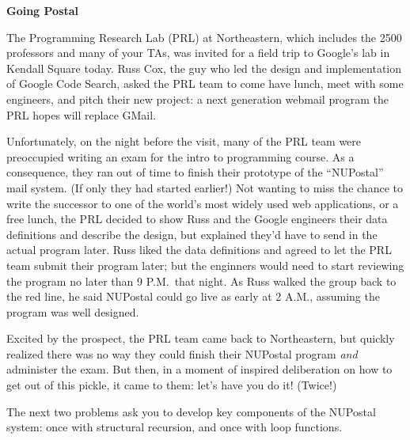 \documentclass[12pt]{article}                   %
\begin{document}
\vfill\thispagestyle{empty}
\newpage

\fi


\noindent
{\bf Going Postal}

The Programming Research Lab (PRL) at Northeastern, which includes the
2500 professors and many of your TAs, was invited for a field
trip to Google's lab in Kendall Square today.  Russ Cox, the guy who
led the design and implementation of Google Code Search, asked the
PRL team to come have lunch, meet with some engineers, and pitch their
new project: a next generation webmail program the PRL hopes will
replace GMail.

Unfortunately, on the night before the visit, many of the PRL team
were preoccupied writing an exam for the intro to programming course.
As a consequence, they ran out of time to finish their prototype of
the ``NUPostal'' mail system.  (If only they had started earlier!)
Not wanting to miss the chance to write the successor to one of the
world's most widely used web applications, or a free lunch, the PRL
decided to show Russ and the Google engineers their data definitions
and describe the design, but explained they'd have to send in the
actual program later.  Russ liked the data definitions and agreed to
let the PRL team submit their program later; but the enginners would
need to start reviewing the program no later than 9 P.M.~that night.
As Russ walked the group back to the red line, he said NUPostal could
go live as early at 2 A.M., assuming the program was well designed.

Excited by the prospect, the PRL team came back to Northeastern, but
quickly realized there was no way they could finish their NUPostal
program \emph{and} administer the exam.  But then, in a moment of
inspired deliberation on how to get out of this pickle, it came to them:
let's have you do it!  (Twice!)

The next two problems ask you to develop key components of the
NUPostal system: once with structural recursion, and once with loop functions.
\end{document}
